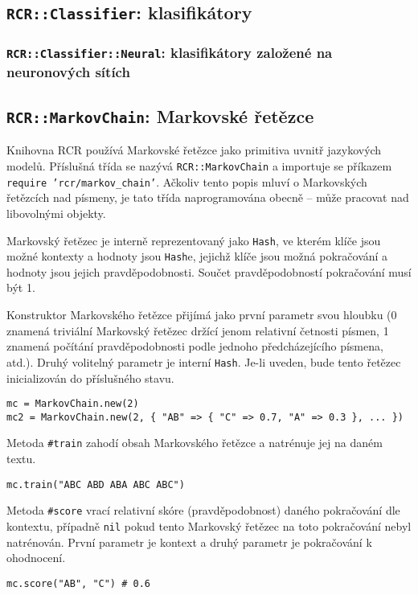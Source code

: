 \documentclass[a4paper]{article}
\begin{document}


\subsection{\texttt{RCR::Classifier}: klasifikátory}
\subsubsection{\texttt{RCR::Classifier::Neural}: klasifikátory založené na
neuronových sítích}

\subsection{\texttt{RCR::MarkovChain}: Markovské řetězce}
Knihovna RCR používá Markovské řetězce jako primitiva uvnitř jazykových modelů.
Příslušná třída se nazývá \texttt{RCR::MarkovChain} a importuje se příkazem
\texttt{require 'rcr/markov\_chain'}. Ačkoliv tento popis mluví o Markovských
řetězcích nad písmeny, je tato třída naprogramována obecně -- může pracovat nad
libovolnými objekty.

Markovský řetězec je interně reprezentovaný jako \texttt{Hash}, ve kterém klíče
jsou možné kontexty a hodnoty jsou \texttt{Hash}e, jejichž klíče jsou možná
pokračování a hodnoty jsou jejich pravděpodobnosti. Součet pravděpodobností
pokračování musí být 1.

Konstruktor Markovského řetězce přijímá jako první parametr svou hloubku (0
znamená triviální Markovský řetězec držící jenom relativní četnosti písmen, 1
znamená počítání pravděpodobnosti podle jednoho předcházejícího písmena, atd.).
Druhý volitelný parametr je interní \texttt{Hash}. Je-li uveden, bude tento
řetězec inicializován do příslušného stavu.
\begin{lstlisting}
mc = MarkovChain.new(2)
mc2 = MarkovChain.new(2, { "AB" => { "C" => 0.7, "A" => 0.3 }, ... })
\end{lstlisting}

Metoda \texttt{\#train} zahodí obsah Markovského řetězce a natrénuje jej na
daném textu.
\begin{lstlisting}
mc.train("ABC ABD ABA ABC ABC")
\end{lstlisting}

Metoda \texttt{\#score} vrací relativní skóre (pravděpodobnost) daného
pokračování dle kontextu, případně \texttt{nil} pokud tento Markovský řetězec
na toto pokračování nebyl natrénován. První parametr je kontext a druhý parametr
je pokračování k ohodnocení.
\begin{lstlisting}
mc.score("AB", "C") # 0.6
\end{lstlisting}
\end{document}
